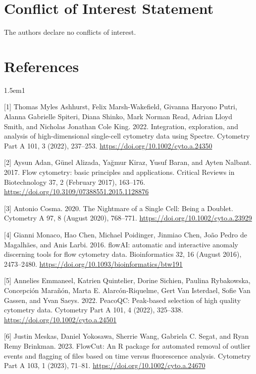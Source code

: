 \documentclass[ASNA]{latex/wiley/USG}
\begin{document}
\FloatBarrier

\section{Conflict of Interest
Statement}\label{conflict-of-interest-statement}

The authors declare no conflicts of interest.

\FloatBarrier

\clearpage

\section{References}\label{references}

\begin{hangparas}{1.5em}{1}

{[}1{]} Thomas Myles Ashhurst, Felix Marsh-Wakefield, Givanna Haryono
Putri, Alanna Gabrielle Spiteri, Diana Shinko, Mark Norman Read, Adrian
Lloyd Smith, and Nicholas Jonathan Cole King. 2022. Integration,
exploration, and analysis of high-dimensional single-cell cytometry data
using Spectre. Cytometry Part A 101, 3 (2022), 237--253.
\url{https://doi.org/10.1002/cyto.a.24350}

{[}2{]} Aysun Adan, Günel Alizada, Yağmur Kiraz, Yusuf Baran, and Ayten
Nalbant. 2017. Flow cytometry: basic principles and applications.
Critical Reviews in Biotechnology 37, 2 (February 2017), 163--176.
\url{https://doi.org/10.3109/07388551.2015.1128876}

{[}3{]} Antonio Cosma. 2020. The Nightmare of a Single Cell: Being a
Doublet. Cytometry A 97, 8 (August 2020), 768--771.
\url{https://doi.org/10.1002/cyto.a.23929}

{[}4{]} Gianni Monaco, Hao Chen, Michael Poidinger, Jinmiao Chen, João
Pedro de Magalhães, and Anis Larbi. 2016. flowAI: automatic and
interactive anomaly discerning tools for flow cytometry data.
Bioinformatics 32, 16 (August 2016), 2473--2480.
\url{https://doi.org/10.1093/bioinformatics/btw191}

{[}5{]} Annelies Emmaneel, Katrien Quintelier, Dorine Sichien, Paulina
Rybakowska, Concepción Marañón, Marta E. Alarcón-Riquelme, Gert Van
Isterdael, Sofie Van Gassen, and Yvan Saeys. 2022. PeacoQC: Peak-based
selection of high quality cytometry data. Cytometry Part A 101, 4
(2022), 325--338. \url{https://doi.org/10.1002/cyto.a.24501}

{[}6{]} Justin Meskas, Daniel Yokosawa, Sherrie Wang, Gabriela C. Segat,
and Ryan Remy Brinkman. 2023. FlowCut: An R package for automated
removal of outlier events and flagging of files based on time versus
fluorescence analysis. Cytometry Part A 103, 1 (2023), 71--81.
\url{https://doi.org/10.1002/cyto.a.24670}


\end{hangparas}
\end{document}
